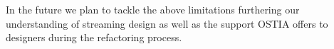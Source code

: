 
In the future we plan to tackle the above limitations furthering our understanding of streaming design as well as the support OSTIA offers to designers during the refactoring process.

